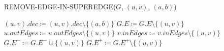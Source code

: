 \begin{algorithm}[H]
    \caption{REMOVE-EDGE-IN-SUPEREDGE($G$, $(u, v)$, $(a, b)$)}\label{alg:remove-edge-in-superedge}
    \begin{algorithmic}[1]
        \State $(u, v).dec \coloneqq (u, v).dec \setminus \{(a, b)\}$
            \State $G.E \coloneqq G.E \setminus \{(u, v)\}$
            \State $u.outEdges \coloneqq u.outEdges \setminus \{(u, v)\}$
            \State $v.inEdges \coloneqq v.inEdges \setminus \{(u, v)\}$
                \State $G.E^- \coloneqq G.E^- \cup \{(u, v)\}$
            \Else
                \State $G.E^+ \coloneqq G.E^+ \setminus \{(u, v)\}$
            \EndIf
        \EndIf
    \end{algorithmic}
\end{algorithm}